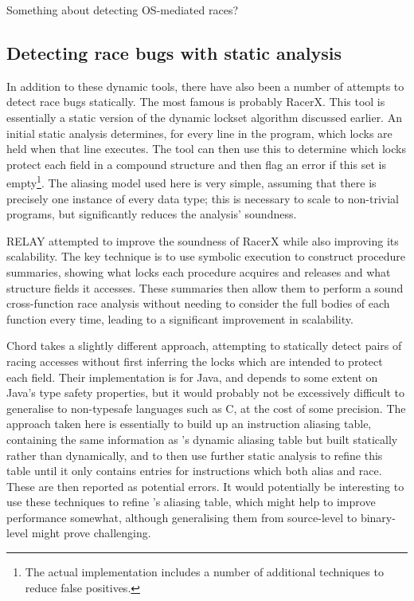 Something about detecting OS-mediated races?

\subsection{Detecting race bugs with static analysis}

In addition to these dynamic tools, there have also been a number of
attempts to detect race bugs statically.  The most famous is probably
RacerX\needCite{}.  This tool is essentially a static version of the
dynamic lockset algorithm discussed earlier.  An initial static
analysis determines, for every line in the program, which locks are
held when that line executes.  The tool can then use this to determine
which locks protect each field in a compound structure and then flag
an error if this set is empty\footnote{The actual implementation
includes a number of additional techniques to reduce false
positives.}.  The aliasing model used here is very simple, assuming
that there is precisely one instance of every data type; this is
necessary to scale to non-trivial programs, but significantly reduces
the analysis' soundness.

RELAY attempted to
improve the soundness of RacerX while also improving its scalability.
The key technique is to use symbolic execution to construct procedure
summaries, showing
what locks each procedure acquires and releases and what structure
fields it accesses.  These summaries then allow them to perform a
sound cross-function race analysis without needing to consider the
full bodies of each function every time, leading to a significant
improvement in scalability.  

Chord takes a slightly
different approach, attempting to statically detect pairs of racing
accesses without first inferring the locks which are intended to
protect each field.  Their implementation is for Java, and depends to
some extent on Java's type safety properties, but it would probably
not be excessively difficult to generalise to non-typesafe languages
such as C, at the cost of some precision.  The approach taken here is
essentially to build up an instruction aliasing table, containing the
same information as {\technique}'s dynamic aliasing table but built
statically rather than dynamically, and to then use further static
analysis to refine this table until it only contains entries for
instructions which both alias and race.  These are then reported as
potential errors.  It would potentially be interesting to use these
techniques to refine {\technique}'s aliasing table, which might help
to improve performance somewhat, although generalising them from
source-level to binary-level might prove challenging.

